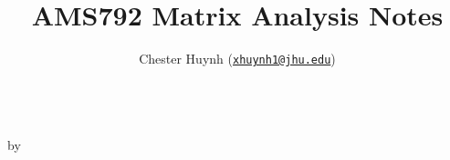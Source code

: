 \documentclass{article}
\title{AMS792 Matrix Analysis Notes}
\author{%
    Chester Huynh (\href{mailto:xhuynh1@jhu.edu}{\texttt{xhuynh1@jhu.edu}})
}
\begin{document}
\makeatletter
\begin{center}
  {\LARGE\bf \@title} \\
  \vspace*{0.5cm}
  by \@author
\end{center}
\makeatother

\tableofcontents
\newpage

\setcounter{section}{-1}
 \clearpage
 \clearpage
 \clearpage
 \clearpage
 \clearpage
 \clearpage
 \clearpage
 \clearpage

\end{document}
